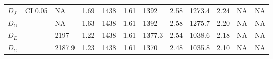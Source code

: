 \begin{table*}[h]
\begin{tabular}{|l|l|llllllllll|}
\hline
$D_J$   & \multirow{4}{*}{CI 0.05} & NA           & 1.69          & 1438         & 1.61          & 1392       & 2.58         & 1273.4     & 2.24        &    NA         &       NA      \\
$D_O$    &                         					  & NA           & 1.63          & 1438         & 1.61          & 1392       & 2.58         & 1275.7     & 2.20        &     NA        &      NA       \\
$D_E$ &                          					 & 2197       & 1.22          & 1438         & 1.61          & 1377.3       & 2.54         & 1038.6     & 2.18        &       NA      &       NA      \\
$D_C$    &                        					   & 2187.9       & 1.23          & 1438         & 1.61          & 1370         & 2.48         & 1035.8     & 2.10        &   NA          &     NA       \\
\hline
\end{tabular}
\end{table*}
